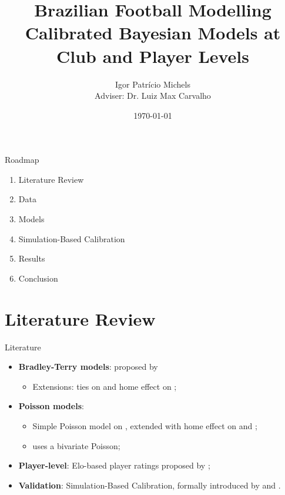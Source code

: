 \documentclass{beamer}
\title[Master's Thesis]
{Brazilian Football Modelling\\Calibrated Bayesian Models at Club and Player Levels}
\author[Igor Patrício Michels]
{
    Igor Patrício Michels \\
    Adviser: Dr. Luiz Max Carvalho
}
\institute[FGV]
{
  School of Applied Mathematics \\
  Fundação Getulio Vargas
}
\date[\today]
{\today}
\begin{document}
\begin{frame}
\titlepage
\end{frame}


\begin{frame}{Roadmap}
    \begin{enumerate}
        \item Literature Review
        \item Data
        \item Models
        \item Simulation-Based Calibration
        \item Results
        \item Conclusion
    \end{enumerate}
\end{frame}

\section{Literature Review}

\begin{frame}{Literature}
    \begin{itemize}
        \item \textbf{Bradley-Terry models}: proposed by \textcite{bradley_terry_1952}
        \begin{itemize}
            \item Extensions: ties on \textcite{davidson_1970} and home effect on \textcite{davidson_1977};
        \end{itemize}

        \item \textbf{Poisson models}:
        \begin{itemize}
            \item Simple Poisson model on \textcite{maher_1982}, extended with home effect on \textcite{dixon_1997} and \textcite{lee_1997};
            \item \textcite{karlis_2003} uses a bivariate Poisson;
        \end{itemize}

        \item \textbf{Player-level}: Elo-based player ratings proposed by \textcite{wolf_2020};

        \item \textbf{Validation}: Simulation-Based Calibration, formally introduced by \textcite{cook_2006} and \textcite{talts_2020}.
    \end{itemize}
\end{frame}
\end{document}
